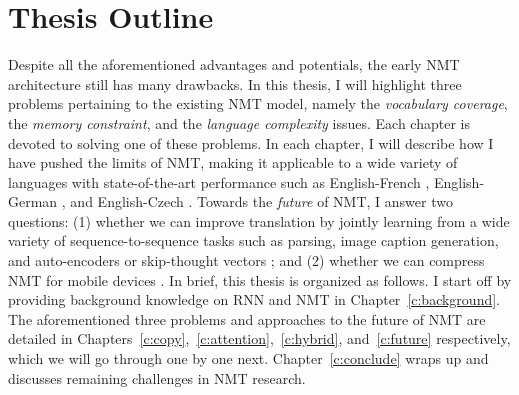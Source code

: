 \section{Thesis Outline}
Despite all the aforementioned advantages and potentials, the early NMT architecture
\cite{sutskever14,cho14} still has many drawbacks. In this thesis, I will
highlight three problems pertaining to the existing NMT model, namely the
{\it vocabulary coverage}, the {\it memory constraint}, and the {\it
language complexity} issues. Each chapter is devoted to solving one of these
problems. In each chapter, I will describe how I have pushed the limits of NMT, making it
applicable to a wide variety of languages with state-of-the-art performance such as
English-French \cite{luong15}, English-German \cite{luong15attn,luong15iwslt}, and
English-Czech \cite{luong16}. Towards the {\it future} of
NMT, I answer two questions: (1) whether we can improve translation by jointly
learning from a wide variety of sequence-to-sequence tasks such as parsing,
image caption generation, and auto-encoders or skip-thought vectors
\cite{luong16iclr}; and (2)
whether we can compress NMT for mobile devices \cite{see16}.
In brief, this thesis is organized as follows. I start off by providing background knowledge on RNN and NMT
in Chapter~\ref{c:background}. 
The aforementioned three problems and approaches to the future of NMT are detailed in
Chapters~\ref{c:copy},~\ref{c:attention},~\ref{c:hybrid}, and~\ref{c:future}
respectively, which we will go through one by one next.
Chapter~\ref{c:conclude} wraps up and discusses remaining challenges in NMT research.

